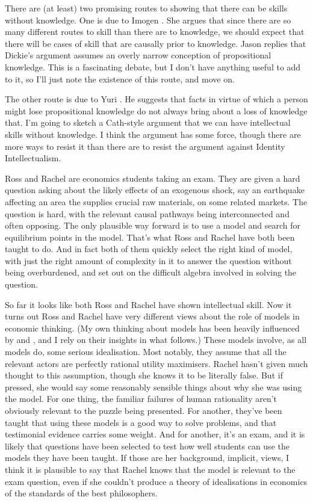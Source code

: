 There are (at least) two promising routes to showing that there can be skills without knowledge. One is due to Imogen \citet{Dickie2012}. She argues that since there are so many different routes to skill than there are to knowledge, we should expect that there will be cases of skill that are causally prior to knowledge. Jason \citet{Stanley2012-Replies} replies that Dickie's argument assumes an overly narrow conception of propositional knowledge. This is a fascinating debate, but I don't have anything useful to add to it, so I'll just note the existence of this route, and move on.

The other route is due to Yuri \citet{Cath2011}. He suggests that facts in virtue of which a person might lose propositional knowledge do not always bring about a loss of knowledge that. I'm going to sketch a Cath-style argument that we can have intellectual skills without knowledge. I think the argument has some force, though there are more ways to resist it than there are to resist the argument against Identity Intellectualism.

Ross and Rachel are economics students taking an exam. They are given a hard question asking about the likely effects of an exogenous shock, say an earthquake affecting an area the supplies crucial raw materials, on some related markets. The question is hard, with the relevant causal pathways being interconnected and often opposing. The only plausible way forward is to use a model and search for equilibrium points in the model. That's what Ross and Rachel have both been taught to do. And in fact both of them quickly select the right kind of model, with just the right amount of complexity in it to answer the question without being overburdened, and set out on the difficult algebra involved in solving the question.

So far it looks like both Ross and Rachel have shown intellectual skill. Now it turns out Ross and Rachel have very different views about the role of models in economic thinking. (My own thinking about models has been heavily influenced by \cite[ch. 8]{Strevens2008} and \citet{Davey2011}, and I rely on their insights in what follows.) These models involve, as all models do, some serious idealisation. Most notably, they assume that all the relevant actors are perfectly rational utility maximisers. Rachel hasn't given much thought to this assumption, though she knows it to be literally false. But if pressed, she would say some reasonably sensible things about why she was using the model. For one thing, the familiar failures of human rationality aren't obviously relevant to the puzzle being presented. For another, they've been taught that using these models is a good way to solve problems, and that testimonial evidence carries some weight. And for another, it's an exam, and it is likely that questions have been selected to test how well students can use the models they have been taught. If those are her background, implicit, views, I think it is plausible to say that Rachel knows that the model is relevant to the exam question, even if she couldn't produce a theory of idealisations in economics of the standards of the best philosophers.

